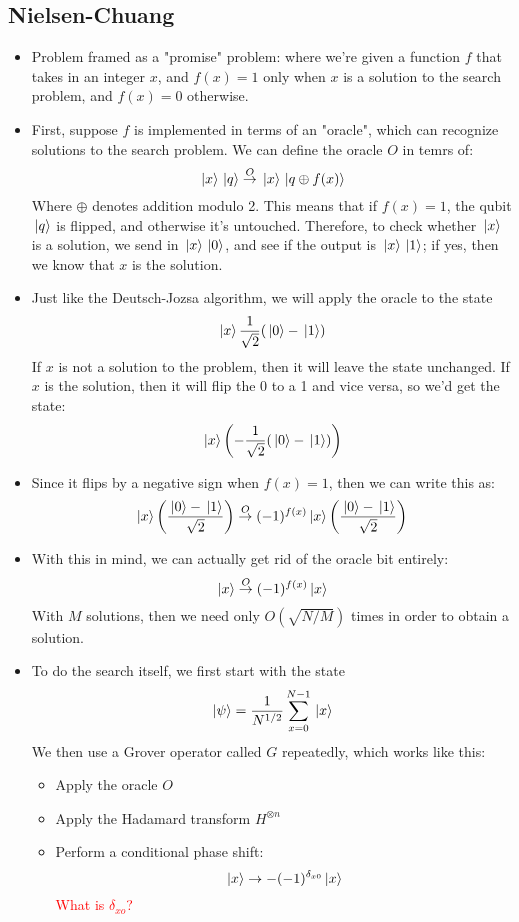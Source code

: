 \documentclass[10pt]{article}
\newcommand{\question}[1]{\textcolor{red}{#1}}
\begin{document}
	\subsection{Nielsen-Chuang}
	\begin{itemize}
		\item Problem framed as a "promise" problem: where we're given a function \( f \) that takes in an 
			integer \( x \), and  \( f(x) = 1 \) only when \( x \) is a solution to the search problem, and 
			\( f(x) = 0 \) otherwise. 
		\item First, suppose \( f \) is implemented in terms of an "oracle", which can recognize solutions 
			to the search problem. We can define the oracle \( O \) in temrs of:
			\[
				\ket*{x}\ket*{q} \overset{O}\rightarrow \ket*{x}\ket*{q \oplus f(x)}
			\] 
			Where \( \oplus \) denotes addition modulo 2. This means that if \( f(x) = 1 \), the qubit 
			\( \ket*{q} \) is flipped, and otherwise it's untouched. Therefore, to check whether 
			\( \ket*{x} \) is a solution, we send in \( \ket*{x}\ket*{0} \), and see if the output 
			is \( \ket*{x}\ket*{1} \); if yes, then we know that \( x \) is the solution. 
		\item Just like the Deutsch-Jozsa algorithm, we will apply the oracle to the state
			\[
			\ket*{x}\frac{1}{\sqrt{2} }(\ket*{0} - \ket*{1})
			\] 
			If \( x \) is not a solution to the problem, then it will leave the state unchanged. If \( x \) is the 
			solution, then it will flip the 0 to a 1 and vice versa, so we'd get the state:
			\[
			\ket*{x}\left(-\frac{1}{\sqrt{2} }(\ket*{0} - \ket*{1})\right)
			\] 
		\item Since it flips by a negative sign when \( f(x) = 1 \), then we can write this as:
			\[
				\ket*{x}\left( \frac{\ket*{0} - \ket*{1}}{\sqrt{2} } \right) \overset{O}\to 
				(-1)^{f(x)}\ket*{x}\left( \frac{\ket*{0} - \ket*{1}}{\sqrt{2} } \right) 
			\] 
		\item With this in mind, we can actually get rid of the oracle bit entirely:
			\[
				\ket*{x} \overset{O}\to (-1)^{f(x)}\ket*{x}
			\] 
			With \( M  \) solutions, then we need only \( O(\sqrt{N / M}) \) times in order to obtain a solution. 
		\item To do the search itself, we first start with the state
			\[
			\ket*{\psi} = \frac{1}{N^{1 / 2}} \sum_{x=0}^{N-1} \ket*{x}
			\] 
			We then use a Grover operator called \( G \) repeatedly, which works like this:
			\begin{itemize}
				\item Apply the oracle \( O \) 
				\item Apply the Hadamard transform \( H^{\otimes n} \) 
				\item Perform a conditional phase shift:
					\[
					\ket*{x} \to -(-1)^{\delta_{x 0}}\ket*{x}
					\] 
					\question{What is \( \delta_{x o} \)?}


\end{itemize}
\end{itemize}
\end{document}
